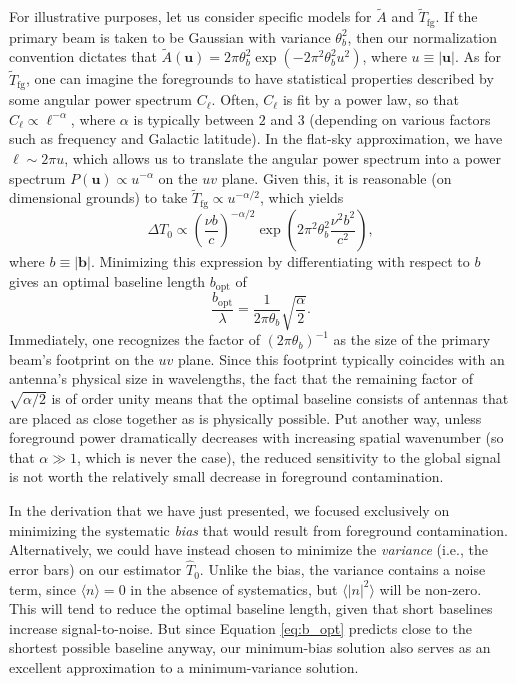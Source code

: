 \documentclass[twolcolumn,apj,iop,numberedappendix]{emulateapj}
\begin{document}
For illustrative purposes, let us consider specific models for $\widetilde{A}$ and $\widetilde{T}_\textrm{fg}$.  If the primary beam is taken to be Gaussian with variance $\theta_b^2$, then our normalization convention dictates that $\widetilde{A}(\mathbf{u}) = 2 \pi \theta_b^2 \exp (-2 \pi^2 \theta_b^2 u^2 )$, where $u \equiv |\mathbf{u}|$.  As for $\widetilde{T}_\textrm{fg}$, one can imagine the foregrounds to have statistical properties described by some angular power spectrum $C_\ell$.  Often, $C_\ell$ is fit by a power law, so that $C_\ell \propto \ell^{-\alpha}$, where $\alpha$ is typically between $2$ and $3$ (depending on various factors such as frequency and Galactic latitude).  In the flat-sky approximation, we have $\ell \sim 2 \pi u$, which allows us to translate the angular power spectrum into a power spectrum $P(\mathbf{u}) \propto u^{-\alpha}$ on the $uv$ plane.  Given this, it is reasonable (on dimensional grounds) to take $\widetilde{T}_\textrm{fg} \propto u^{-\alpha/2}$, which yields
\begin{equation}
\label{eq:DeviationPowGauss}
\Delta T_0 \propto \left( \frac{\nu b}{c}\right)^{-\alpha/2} \exp \left(2 \pi^2 \theta_b^2 \frac{\nu^2 b^2}{c^2}  \right),
\end{equation}
where $b \equiv | \mathbf{b} |$.  Minimizing this expression by differentiating with respect to $b$ gives an optimal baseline length $b_\textrm{opt}$ of
\begin{equation}
\label{eq:b_opt}
\frac{b_\textrm{opt}}{\lambda} = \frac{1}{2\pi \theta_b} \sqrt{\frac{\alpha}{2}}.
\end{equation}
Immediately, one recognizes the factor of $(2 \pi \theta_b)^{-1}$ as the size of the primary beam's footprint on the $uv$ plane.  Since this footprint typically coincides with an antenna's physical size in wavelengths, the fact that the remaining factor of $\sqrt{\alpha / 2}$ is of order unity means that the optimal baseline consists of antennas that are placed as close together as is physically possible.  Put another way, unless foreground power dramatically decreases with increasing spatial wavenumber (so that $\alpha \gg 1$, which is never the case), the reduced sensitivity to the global signal is not worth the relatively small decrease in foreground contamination.

In the derivation that we have just presented, we focused exclusively on minimizing the systematic \emph{bias} that would result from foreground contamination.  Alternatively, we could have instead chosen to minimize the \emph{variance} (i.e., the error bars) on our estimator $\widehat{T}_0$.  Unlike the bias, the variance contains a noise term, since $\langle n \rangle = 0$ in the absence of systematics, but $\langle |n|^2 \rangle$ will be non-zero.  This will tend to reduce the optimal baseline length, given that short baselines increase signal-to-noise.  But since Equation \eqref{eq:b_opt} predicts close to the shortest possible baseline anyway, our minimum-bias solution also serves as an excellent approximation to a minimum-variance solution.
\end{document}
